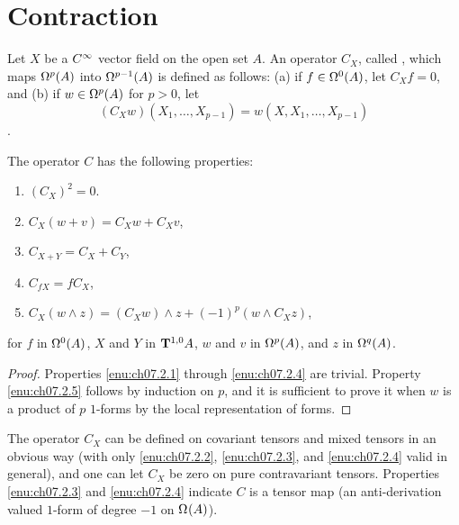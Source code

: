 \documentclass[../main]{subfiles}
\begin{document}
\section{Contraction}\label{ch07:s2}
Let $X$ be a $\CInfty$ vector field on the open set $A$. An operator $C_X$, called , which maps $\formbundle{A}{p}$ into $\formbundle{A}{{p - 1}}$ is defined as follows: (a) if $f \in \formbundle{A}{0}$, let $C_X f = 0$, and (b) if $w \in \formbundle{A}{p}$ for $p > 0$, let \[(C_X w) (X_1, \ldots, X_{p - 1}) = w (X, X_1, \ldots, X_{p - 1})\].



\begin{proposition} \label{prop:ch7.2.1}
The operator $C$ has the following properties:

\begin{enumerate}[label=(\arabic*)]
	\item $(C_X)^2 = 0$. \label{enu:ch07.2.1}
	\item $C_X(w + v) = C_X w + C_X v$,\label{enu:ch07.2.2}
	\item $C_{X + Y} = C_X + C_Y$,\label{enu:ch07.2.3}
	\item $C_{f X} = f C_X$,\label{enu:ch07.2.4}
	\item $C_X(w \wedge z) = (C_X w) \wedge z + (-1)^p (w \wedge C_X z)$,\label{enu:ch07.2.5}
\end{enumerate}

for $f$ in $\formbundle{A}{0}$, $X$ and $Y$ in $\tensorbundle{A}{1}{0}$, $w$ and $v$ in $\formbundle{A}{p}$, and $z$ in $\formbundle{A}{q}$.
\end{proposition}

\begin{proof}
Properties \ref{enu:ch07.2.1} through \ref{enu:ch07.2.4} are trivial. Property \ref{enu:ch07.2.5} follows by induction on $p$, and it is sufficient to prove it when $w$ is a product of $p$ $1$-forms by the local representation of forms.
\end{proof}



The operator $C_X$ can be defined on covariant tensors and mixed tensors in an obvious way (with only \ref{enu:ch07.2.2}, \ref{enu:ch07.2.3}, and \ref{enu:ch07.2.4} valid in general), and one can let $C_X$ be zero on pure contravariant tensors. Properties \ref{enu:ch07.2.3} and \ref{enu:ch07.2.4} indicate $C$ is a tensor map (an anti-derivation valued $1$-form of degree $-1$ on $\formbundle{A}{}$).
\end{document}

